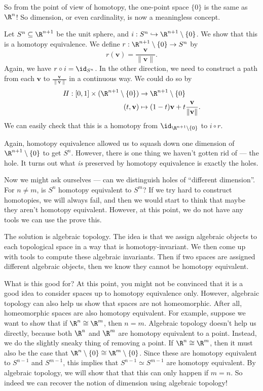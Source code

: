 \documentclass[a4paper]{article}
\theoremstyle{definition}
\begin{document}
So from the point of view of homotopy, the one-point space $\{0\}$ is the same as $\R^n$! So dimension, or even cardinality, is now a meaningless concept.

\begin{eg}
  Let $S^n \subseteq \R^{n + 1}$ be the unit sphere, and $i: S^n \hookrightarrow \R^{n + 1} \setminus \{0\}$. We show that this is a homotopy equivalence. We define $r: \R^{n + 1} \setminus \{0\} \to S^n$ by
  \[
    r(\mathbf{v}) = \frac{\mathbf{v}}{\|\mathbf{v}\|}.
  \]
  Again, we have $r \circ i = \id_{S^n}$. In the other direction, we need to construct a path from each $\mathbf{v}$ to $\frac{\mathbf{v}}{\|\mathbf{v}\|}$ in a continuous way. We could do so by
  \begin{align*}
    H: [0, 1] \times (\R^{n + 1} \setminus \{0\}) &\to \R^{n + 1} \setminus \{0\}\\
    (t, \mathbf{v}) &\mapsto (1 - t) \mathbf{v} + t \frac{\mathbf{v}}{\|\mathbf{v}\|}.
  \end{align*}
  We can easily check that this is a homotopy from $\id_{\R^{n + 1}\setminus \{0\}}$ to $i \circ r$.
\end{eg}

Again, homotopy equivalence allowed us to squash down one dimension of $\R^{n + 1} \setminus \{0\}$ to get $S^n$. However, there is one thing we haven't gotten rid of --- the hole. It turns out what \emph{is} preserved by homotopy equivalence is exactly the holes.

Now we might ask ourselves --- can we distinguish holes of ``different dimension''. For $n \not= m$, is $S^n$ homotopy equivalent to $S^m$? If we try hard to construct homotopies, we will always fail, and then we would start to think that maybe they aren't homotopy equivalent. However, at this point, we do not have any tools we can use the prove this.

The solution is algebraic topology. The idea is that we assign algebraic objects to each topological space in a way that is homotopy-invariant. We then come up with tools to compute these algebraic invariants. Then if two spaces are assigned different algebraic objects, then we know they cannot be homotopy equivalent.

What is this good for? At this point, you might not be convinced that it is a good idea to consider spaces up to homotopy equivalence only. However, algebraic topology can also help us show that spaces are not homeomorphic. After all, homeomorphic spaces are also homotopy equivalent. For example, suppose we want to show that if $\R^n \cong \R^m$, then $n = m$. Algebraic topology doesn't help us directly, because both $\R^n$ and $\R^m$ are homotopy equivalent to a point. Instead, we do the slightly sneaky thing of removing a point. If $\R^n \cong \R^m$, then it must also be the case that $\R^n \setminus \{0\} \cong \R^m \setminus \{0\}$. Since these are homotopy equivalent to $S^{n - 1}$ and $S^{m - 1}$, this implies that $S^{n - 1} \simeq S^{m - 1}$ are homotopy equivalent. By algebraic topology, we will show that that this can only happen if $m = n$. So indeed we can recover the notion of dimension using algebraic topology!
\end{document}
